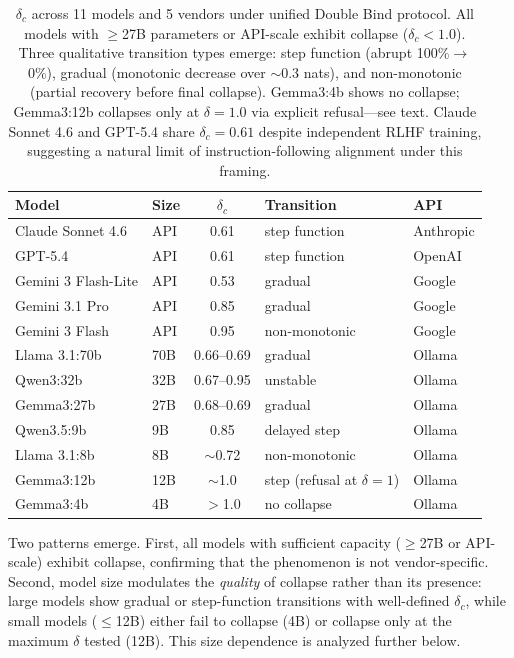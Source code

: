 \documentclass[11pt,a4paper]{article}
\begin{document}
\begin{table}[htbp]
\centering
\small
\begin{tabular}{llcll}
\toprule
\textbf{Model} & \textbf{Size} & $\delta_c$ & \textbf{Transition} & \textbf{API} \\
\midrule
Claude Sonnet 4.6 & API & 0.61 & step function & Anthropic \\
GPT-5.4 & API & 0.61 & step function & OpenAI \\
Gemini 3 Flash-Lite & API & 0.53 & gradual & Google \\
Gemini 3.1 Pro & API & 0.85 & gradual & Google \\
Gemini 3 Flash & API & 0.95 & non-monotonic & Google \\
\midrule
Llama 3.1:70b & 70B & 0.66--0.69 & gradual & Ollama \\
Qwen3:32b & 32B & 0.67--0.95 & unstable & Ollama \\
Gemma3:27b & 27B & 0.68--0.69 & gradual & Ollama \\
Qwen3.5:9b & 9B & 0.85 & delayed step & Ollama \\
Llama 3.1:8b & 8B & $\sim$0.72 & non-monotonic & Ollama \\
Gemma3:12b & 12B & $\sim$1.0 & step (refusal at $\delta{=}1$) & Ollama \\
Gemma3:4b & 4B & $>$1.0 & no collapse & Ollama \\
\bottomrule
\end{tabular}
\caption{$\delta_c$ across 11 models and 5 vendors under unified Double Bind protocol. All models with $\geq$27B parameters or API-scale exhibit collapse ($\delta_c < 1.0$). Three qualitative transition types emerge: step function (abrupt 100\%$\to$0\%), gradual (monotonic decrease over $\sim$0.3 nats), and non-monotonic (partial recovery before final collapse). Gemma3:4b shows no collapse; Gemma3:12b collapses only at $\delta = 1.0$ via explicit refusal---see text. Claude Sonnet 4.6 and GPT-5.4 share $\delta_c = 0.61$ despite independent RLHF training, suggesting a natural limit of instruction-following alignment under this framing.}
\label{tab:cross-model}
\end{table}

Two patterns emerge. First, all models with sufficient capacity ($\geq$27B or API-scale) exhibit collapse, confirming that the phenomenon is not vendor-specific. Second, model size modulates the \emph{quality} of collapse rather than its presence: large models show gradual or step-function transitions with well-defined $\delta_c$, while small models ($\leq$12B) either fail to collapse (4B) or collapse only at the maximum $\delta$ tested (12B). This size dependence is analyzed further below.
\end{document}
